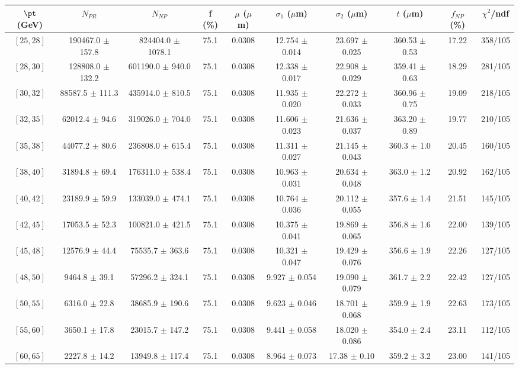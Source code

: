 \begin{tabular}{c||c|c|c|c|c|c|c||c|c}
$\pt$ (GeV) & $N_{PR}$ & $N_{NP}$ & f (\%) & $\mu$ ($\mu$m) & $\sigma_1$ ($\mu$m) & $\sigma_2$ ($\mu$m)  & $t$ ($\mu$m) & $f_{NP}$ (\%) & $\chi^2$/ndf \\
\hline
$[25, 28]$ & 190467.0 $\pm$ 157.8 & 824404.0 $\pm$ 1078.1 & 75.1 & 0.0308 & 12.754 $\pm$ 0.014 & 23.697 $\pm$ 0.025 & 360.53 $\pm$ 0.53 & 17.22 & 358/105\\
$[28, 30]$ & 128808.0 $\pm$ 132.2 & 601190.0 $\pm$ 940.0 & 75.1 & 0.0308 & 12.338 $\pm$ 0.017 & 22.908 $\pm$ 0.029 & 359.41 $\pm$ 0.63 & 18.29 & 281/105\\
$[30, 32]$ & 88587.5 $\pm$ 111.3 & 435914.0 $\pm$ 810.5 & 75.1 & 0.0308 & 11.935 $\pm$ 0.020 & 22.272 $\pm$ 0.033 & 360.96 $\pm$ 0.75 & 19.09 & 218/105\\
$[32, 35]$ & 62012.4 $\pm$ 94.6 & 319026.0 $\pm$ 704.0 & 75.1 & 0.0308 & 11.606 $\pm$ 0.023 & 21.636 $\pm$ 0.037 & 363.20 $\pm$ 0.89 & 19.77 & 210/105\\
$[35, 38]$ & 44077.2 $\pm$ 80.6 & 236808.0 $\pm$ 615.4 & 75.1 & 0.0308 & 11.311 $\pm$ 0.027 & 21.145 $\pm$ 0.043 & 360.3 $\pm$ 1.0 & 20.45 & 160/105\\
$[38, 40]$ & 31894.8 $\pm$ 69.4 & 176311.0 $\pm$ 538.4 & 75.1 & 0.0308 & 10.963 $\pm$ 0.031 & 20.634 $\pm$ 0.048 & 363.0 $\pm$ 1.2 & 20.92 & 162/105\\
$[40, 42]$ & 23189.9 $\pm$ 59.9 & 133039.0 $\pm$ 474.1 & 75.1 & 0.0308 & 10.764 $\pm$ 0.036 & 20.112 $\pm$ 0.055 & 357.6 $\pm$ 1.4 & 21.51 & 145/105\\
$[42, 45]$ & 17053.5 $\pm$ 52.3 & 100821.0 $\pm$ 421.5 & 75.1 & 0.0308 & 10.375 $\pm$ 0.041 & 19.869 $\pm$ 0.065 & 356.8 $\pm$ 1.6 & 22.00 & 139/105\\
$[45, 48]$ & 12576.9 $\pm$ 44.4 & 75535.7 $\pm$ 363.6 & 75.1 & 0.0308 & 10.321 $\pm$ 0.047 & 19.429 $\pm$ 0.076 & 356.6 $\pm$ 1.9 & 22.26 & 127/105\\
$[48, 50]$ & 9464.8 $\pm$ 39.1 & 57296.2 $\pm$ 324.1 & 75.1 & 0.0308 & 9.927 $\pm$ 0.054 & 19.090 $\pm$ 0.079 & 361.7 $\pm$ 2.2 & 22.42 & 127/105\\
$[50, 55]$ & 6316.0 $\pm$ 22.8 & 38685.9 $\pm$ 190.6 & 75.1 & 0.0308 & 9.623 $\pm$ 0.046 & 18.701 $\pm$ 0.068 & 359.9 $\pm$ 1.9 & 22.63 & 173/105\\
$[55, 60]$ & 3650.1 $\pm$ 17.8 & 23015.7 $\pm$ 147.2 & 75.1 & 0.0308 & 9.441 $\pm$ 0.058 & 18.020 $\pm$ 0.086 & 354.0 $\pm$ 2.4 & 23.11 & 112/105\\
$[60, 65]$ & 2227.8 $\pm$ 14.2 & 13949.8 $\pm$ 117.4 & 75.1 & 0.0308 & 8.964 $\pm$ 0.073 & 17.38 $\pm$ 0.10 & 359.2 $\pm$ 3.2 & 23.00 & 141/105\\

\end{tabular}

